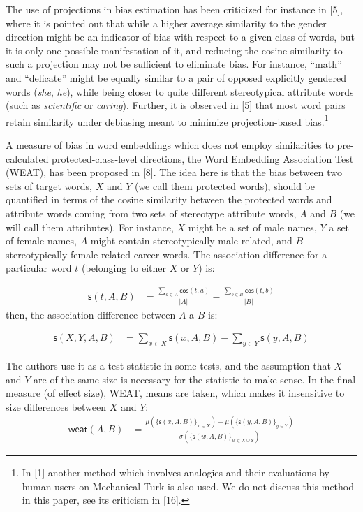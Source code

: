 \documentclass[
  10pt,
  dvipsnames,enabledeprecatedfontcommands]{scrartcl}
\begin{document}
The use of projections in bias estimation has been criticized for
instance in {[}5{]}, where it is pointed out that while a higher average
similarity to the gender direction might be an indicator of bias with
respect to a given class of words, but it is only one possible
manifestation of it, and reducing the cosine similarity to such a
projection may not be sufficient to eliminate bias. For instance,
``math'' and ``delicate'' might be equally similar to a pair of opposed
explicitly gendered words (\emph{she}, \emph{he}), while being closer to
quite different stereotypical attribute words (such as \emph{scientific}
or \emph{caring}). Further, it is observed in {[}5{]} that most word
pairs retain similarity under debiasing meant to minimize
projection-based bias.\footnote{In {[}1{]} another method which involves
  analogies and their evaluations by human users on Mechanical Turk is
  also used. We do not discuss this method in this paper, see its
  criticism in {[}16{]}.}

A measure of bias in word embeddings which does not employ similarities
to pre-calculated protected-class-level directions, the Word Embedding
Association Test (WEAT), has been proposed in {[}8{]}. The idea here is
that the bias between two sets of target words, \(X\) and \(Y\) (we call
them protected words), should be quantified in terms of the cosine
similarity between the protected words and attribute words coming from
two sets of stereotype attribute words, \(A\) and \(B\) (we will call
them attributes). For instance, \(X\) might be a set of male names,
\(Y\) a set of female names, \(A\) might contain stereotypically
male-related, and \(B\) stereotypically female-related career words. The
association difference for a particular word \(t\) (belonging to either
\(X\) or \(Y\)) is:

\vspace{-2mm}

\begin{align*}
\mathsf{s}(t,A,B) & = \frac{\sum_{a\in A}\mathsf{cos}(t,a)}{\vert A\vert} - \frac{\sum_{b\in B}\mathsf{cos}(t,b)}{\vert B\vert}
\end{align*} \normalsize \noindent then, the association difference
between \(A\) a \(B\) is:

\begin{align*}
\mathsf{s}(X,Y,A,B) & = \sum_{x\in X} \mathsf{s}(x,A,B) -  \sum_{y\in Y} \mathsf{s}(y,A,B)
\end{align*}

\noindent The authors use it as a test statistic in some tests, and the
assumption that \(X\) and \(Y\) are of the same size is necessary for
the statistic to make sense. In the final measure (of effect size),
WEAT, means are taken, which makes it insensitive to size differences
between \(X\) and \(Y\): \begin{align}
\mathsf{weat}(A,B) & = \frac{
\mu(\{\mathsf{s}(x,A,B)\}_{x\in X}) -\mu(\{\mathsf{s}(y,A,B)\}_{y\in Y}) 
}{
\sigma(\{\mathsf{s}(w,A,B)\}_{w\in X\cup Y})
}
\end{align}
\end{document}
